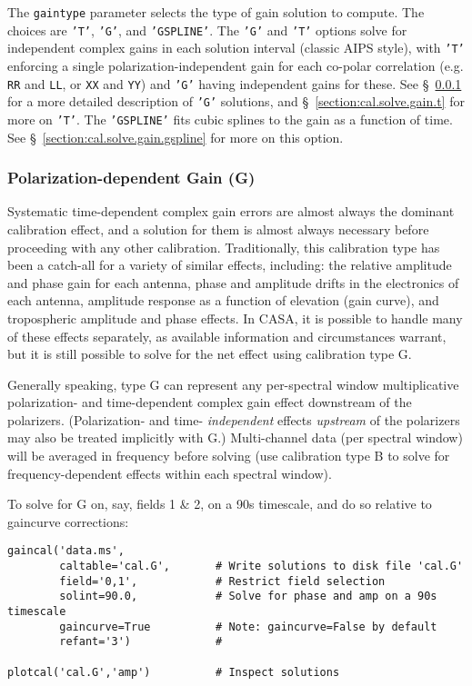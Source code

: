 The {\tt gaintype} parameter selects the type of gain solution to
compute.  The choices are {\tt 'T'}, {\tt 'G'}, and {\tt 'GSPLINE'}.
The {\tt 'G'} and {\tt 'T'} options solve for independent complex
gains in each solution interval (classic AIPS style), with {\tt 'T'} 
enforcing a single polarization-independent gain for each co-polar
correlation (e.g. {\tt RR} and {\tt LL}, or {\tt XX} and {\tt YY})
and {\tt 'G'} having independent gains for these.  
See \S~\ref{section:cal.solve.gain.g} for a more detailed description
of {\tt 'G'} solutions, and \S~\ref{section:cal.solve.gain.t} for more
on {\tt 'T'}.  The {\tt 'GSPLINE'} fits cubic splines to the gain as
a function of time.  See \S~\ref{section:cal.solve.gain.gspline} for
more on this option.

\subsubsection{Polarization-dependent Gain (G)}
\label{section:cal.solve.gain.g}

Systematic time-dependent complex gain errors are almost always the
dominant calibration effect, and a solution for them is almost always
necessary before proceeding with any other calibration.
Traditionally, this calibration type has been a catch-all for a
variety of similar effects, including: the relative amplitude and
phase gain for each antenna, phase and amplitude drifts in the
electronics of each antenna, amplitude response as a function of
elevation (gain curve), and tropospheric amplitude and phase effects.
In CASA, it is possible to handle many of these effects separately, as
available information and circumstances warrant, but it is still
possible to solve for the net effect using calibration type G.

Generally speaking, type G can represent any per-spectral window
multiplicative polarization- and time-dependent complex gain effect
downstream of the polarizers.  (Polarization- and time- {\it independent} effects
{\it upstream} of the polarizers may also be treated implicitly with G.)
Multi-channel data (per spectral window) will be averaged in frequency
before solving (use calibration type B to solve for
frequency-dependent effects within each spectral window).

To solve for G on, say, fields 1 \& 2, on a 90s timescale, and do so
relative to gaincurve corrections:
\small
\begin{verbatim}
gaincal('data.ms',
        caltable='cal.G',       # Write solutions to disk file 'cal.G'
        field='0,1',            # Restrict field selection
        solint=90.0,            # Solve for phase and amp on a 90s timescale
        gaincurve=True          # Note: gaincurve=False by default
        refant='3')             #
			        
plotcal('cal.G','amp')          # Inspect solutions
\end{verbatim}
\normalsize

